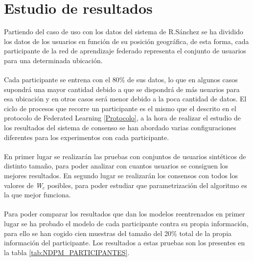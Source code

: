 \newtoggle{inTableHeader}%
\toggletrue{inTableHeader}%
\newcommand*{\StartTableHeader}{\global\toggletrue{inTableHeader}}%
\newcommand*{\EndTableHeader}{\global\togglefalse{inTableHeader}}%
\section{Estudio de resultados}
Partiendo del caso de uso con los datos del sistema de R.Sánchez se ha dividido los datos de los usuarios en función de su posición geográfica, de esta forma, cada participante de la red de aprendizaje federado representa el conjunto de usuarios para una determinada ubicación.
\\ \\
Cada participante se entrena con el 80\% de sus datos, lo que en algunos casos supondrá una mayor cantidad debido a que se dispondrá de más usuarios para esa ubicación y en otros casos será menor debido a la poca cantidad de datos. El ciclo de procesos que recorre un participante es el mismo que el descrito en el protocolo de Federated Learning \ref{Protocolo}, a la hora de realizar el estudio de los resultados del sistema de consenso se han abordado varias configuraciones diferentes para los experimentos con cada participante.
\\\\
En primer lugar se realizarán las pruebas con conjuntos de usuarios sintéticos de distinto tamaño, para poder analizar con cuantos usuarios se consiguen los mejores resultados. En segundo lugar se realizarán los consensos con todos los valores de \textit{W$_c$} posibles, para poder estudiar que parametrización del algoritmo es la que mejor funciona.
\\\\
Para poder comparar los resultados que dan los modelos reentrenados en primer lugar se ha probado el modelo de cada participante contra su propia información, para ello se han cogido cien muestras del tamaño del 20\% total de la propia información del participante. Los resultados a estas pruebas son los presentes en la tabla \ref{tab:NDPM_PARTICIPANTES}. 
